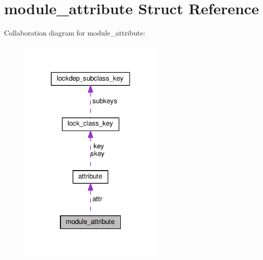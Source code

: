 \hypertarget{structmodule__attribute}{}\section{module\+\_\+attribute Struct Reference}
\label{structmodule__attribute}


Collaboration diagram for module\+\_\+attribute\+:
\nopagebreak
\begin{figure}[H]
\begin{center}
\leavevmode
\includegraphics[width=196pt]{structmodule__attribute__coll__graph}
\end{center}
\end{figure}
